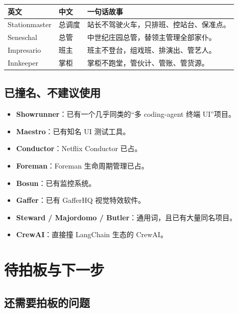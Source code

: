 \documentclass[UTF8,11pt,a4paper,fontset=windows]{ctexart}
\let\ocsection\section
\renewcommand{\section}{\Needspace{8\baselineskip}\ocsection}
\let\ocsubsection\subsection
\renewcommand{\subsection}{\Needspace{5\baselineskip}\ocsubsection}
\begin{document}
\noindent\begin{minipage}{\linewidth}
\centering
{}
\small
\begin{tabularx}{\linewidth}{@{}p{2.8cm} p{1.8cm} X@{}}
\toprule
\textbf{英文} & \textbf{中文} & \textbf{一句话故事} \\
\midrule
Stationmaster & 总调度 & 站长不驾驶火车，只排班、控站台、保准点。 \\
Seneschal & 总管 & 中世纪庄园总管，替领主管理全部家仆。 \\
Impresario & 班主 & 班主不登台，组戏班、排演出、管艺人。 \\
Innkeeper & 掌柜 & 掌柜不跑堂，管伙计、管账、管货源。 \\
\bottomrule
\end{tabularx}
\end{minipage}

\subsection{已撞名、不建议使用}

\begin{itemize}
  \item \textbf{Showrunner}：已有一个几乎同类的“多 coding-agent 终端 UI”项目。
  \item \textbf{Maestro}：已有知名 UI 测试工具。
  \item \textbf{Conductor}：Netflix Conductor 已占。
  \item \textbf{Foreman}：Foreman 生命周期管理已占。
  \item \textbf{Bosun}：已有监控系统。
  \item \textbf{Gaffer}：已有 GafferHQ 视觉特效软件。
  \item \textbf{Steward / Majordomo / Butler}：通用词，且已有大量同名项目。
  \item \textbf{CrewAI}：直接撞 LangChain 生态的 CrewAI。
\end{itemize}

\section{待拍板与下一步}

\subsection{还需要拍板的问题}
\end{document}
